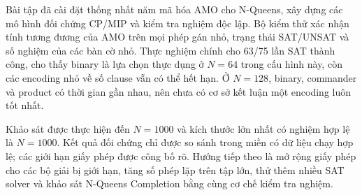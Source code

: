 Bài tập đã cài đặt thống nhất năm mã hóa AMO cho N-Queens, xây dựng các mô hình đối chứng CP/MIP và kiểm tra nghiệm độc lập. Bộ kiểm thử xác nhận tính tương đương của AMO trên mọi phép gán nhỏ, trạng thái SAT/UNSAT và số nghiệm của các bàn cờ nhỏ. Thực nghiệm chính cho 63/75 lần SAT thành công, cho thấy binary là lựa chọn thực dụng ở $N=64$ trong cấu hình này, còn các encoding nhỏ về số clause vẫn có thể hết hạn. Ở $N=128$, binary, commander và product có thời gian gần nhau, nên chưa có cơ sở kết luận một encoding luôn tốt nhất.

Khảo sát được thực hiện đến $N=1000$ và kích thước lớn nhất có nghiệm hợp lệ là $N=1000$. Kết quả đối chứng chỉ được so sánh trong miền có dữ liệu chạy hợp lệ; các giới hạn giấy phép được công bố rõ. Hướng tiếp theo là mở rộng giấy phép cho các bộ giải bị giới hạn, tăng số phép lặp trên tập lớn, thử thêm nhiều SAT solver và khảo sát N-Queens Completion bằng cùng cơ chế kiểm tra nghiệm.
